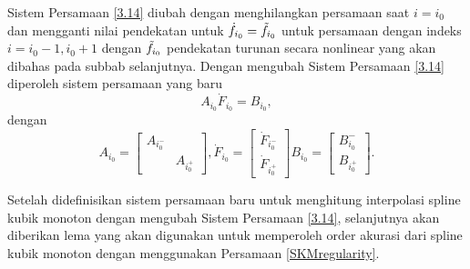 Sistem Persamaan \eqref{3.14} diubah dengan menghilangkan persamaan saat $i=i_0$ dan mengganti nilai pendekatan untuk $\dot{f}_{i_0}=\Tilde{f}_{i_0}$ untuk persamaan dengan indeks \mbox{$i=i_0-1,i_0+1$} dengan $\Tilde{f}_{i_0}$ pendekatan turunan secara nonlinear yang akan dibahas pada subbab selanjutnya. Dengan mengubah Sistem Persamaan \eqref{3.14} diperoleh sistem persamaan yang baru 
\begin{equation} \label{SKMregularity}
A_{i_0}\dot{F}_{i_0}=B_{i_0},
\end{equation}
dengan
\begin{equation}\label{system_i0}
    A_{i_0}=
    \begin{bmatrix}
        A_{i_0^-} & \\
        & A_{i_0^+}
    \end{bmatrix},
    \dot{F}_{i_0}=
    \begin{bmatrix}
        \dot{F}_{i_0^-}\\
        \dot{F}_{i_0^+}
    \end{bmatrix}
    B_{i_0}=
    \begin{bmatrix}
        B_{i_0}^-\\
        B_{i_0^+}
    \end{bmatrix}.
\end{equation}

Setelah didefinisikan sistem persamaan baru untuk menghitung interpolasi spline kubik monoton dengan mengubah Sistem Persamaan \eqref{3.14}, selanjutnya akan diberikan lema yang akan digunakan untuk memperoleh order akurasi dari spline kubik monoton dengan menggunakan Persamaan \eqref{SKMregularity}.

